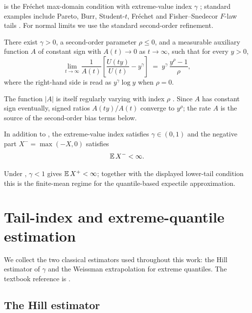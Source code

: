  is the Fr\'echet max-domain condition with
extreme-value index $\gamma$ \parencite[Theorem~1.2.1]{deHaanFerreira2006};
standard examples include Pareto, Burr, Student-$t$, Fr\'echet and
Fisher--Snedecor \(F\)-law tails \parencite[\S2.6]{deHaanFerreira2006}. For
normal limits we use the standard second-order refinement.

\begin{condition}
\label{cond:bg:second-order}
There exist $\gamma > 0$, a second-order parameter $\rho \le 0$, and a
measurable auxiliary function $A$ of constant sign with $A(t) \to 0$ as
$t \to \infty$, such that for every $y > 0$,
\[
  \lim_{t \to \infty} \frac{1}{A(t)}
    \!\left[ \frac{U(t y)}{U(t)} - y^{\gamma}\right]
  \;=\; y^{\gamma}\, \frac{y^{\rho} - 1}{\rho},
\]
where the right-hand side is read as $y^{\gamma} \log y$ when
$\rho = 0$.
\end{condition}

The function $|A|$ is itself regularly varying with index $\rho$
\parencite[Theorem~2.3.9]{deHaanFerreira2006}. Since $A$ has constant
sign eventually, signed ratios $A(t y)/A(t)$ converge to $y^\rho$; the
rate $A$ is the source of the second-order bias terms below.

\begin{condition}
\label{cond:bg:finite-first-moment}
In addition to , the extreme-value index
satisfies $\gamma \in (0,1)$ and the negative part
$X^{-}=\max(-X,0)$ satisfies
\[
  \operatorname{\mathbb{E}} X^{-}<\infty .
\]
\end{condition}

Under , $\gamma<1$ gives $\operatorname{\mathbb{E}} X^{+}<\infty$;
together with the displayed lower-tail condition this is the finite-mean
regime for the quantile-based expectile approximation.

\section{Tail-index and extreme-quantile estimation}
\label{sec:bg:tail-index-quantile}

We collect the two classical estimators used throughout this work: the
Hill estimator of $\gamma$ and the Weissman extrapolation for extreme
quantiles. The textbook reference is
\textcite[Ch.~3--4]{deHaanFerreira2006}.

\subsection{The Hill estimator}
\label{sec:bg:hill}

